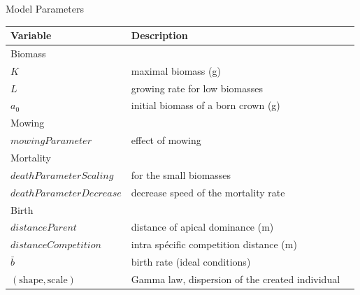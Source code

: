 \documentclass{myBeamer}
\begin{document}
\begin{frame}{Model Parameters}
  \scriptsize
    
\begin{tabular}{lll}
	\hline
   Variable & Description                            \\ %
   	\hline
   Biomass  &                              \\ %
   	\hline
    $K$       &  maximal biomass   (g)    \\ %
    $L$      &  growing rate for low biomasses \\ %
    $a_0$      &  initial  biomass of a born crown (g)  \\ %
       	\hline
   Mowing &                         \\ %
		\hline   
    $mowingParameter$  &  effect of mowing \\  
          \hline
   Mortality &                         \\ 
		\hline
    $deathParameterScaling$  & for the small biomasses \\ %
     $deathParameterDecrease$  &  decrease speed of the mortality rate\\ %
       \hline
  Birth &                           \\ %
		\hline
  $distanceParent$      &  distance of apical dominance (m) \\ %
    $distanceCompetition$       &   intra spécific competition distance (m) \\ %
 	$\bar{b}$    &  birth rate (ideal conditions) \\ %
    $ (\text{shape},\text{scale})$     &   Gamma law, dispersion of the created individual\\ %
     \hline
\end{tabular}
 

\end{frame}
\end{document}
